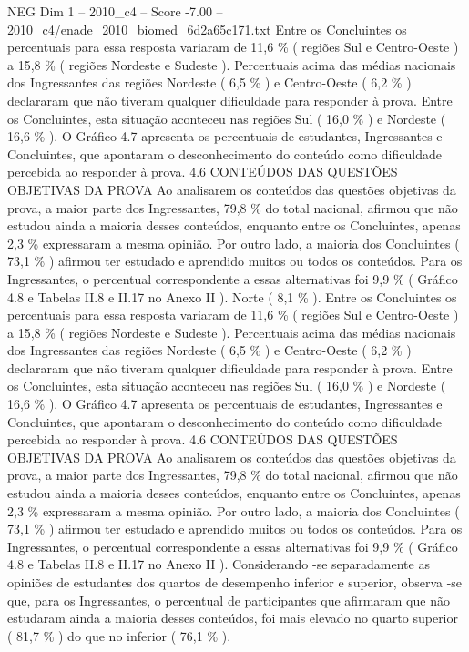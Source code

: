 \begin{textsample}{NEG Dim 1 – 2010\_c4 – Score -7.00 – 2010\_c4/enade\_2010\_biomed\_6d2a65c171.txt}
Entre os Concluintes os percentuais para essa resposta variaram de 11,6 \% ( regiões Sul e Centro-Oeste ) a 15,8 \% ( regiões Nordeste e Sudeste ).
Percentuais acima das médias nacionais dos Ingressantes das regiões Nordeste ( 6,5 \% ) e Centro-Oeste ( 6,2 \% ) declararam que não tiveram qualquer dificuldade para responder à prova.
Entre os Concluintes, esta situação aconteceu nas regiões Sul ( 16,0 \% ) e Nordeste ( 16,6 \% ).
O Gráfico 4.7 apresenta os percentuais de estudantes, Ingressantes e Concluintes, que apontaram o desconhecimento do conteúdo como dificuldade percebida ao responder à prova. 4.6 CONTEÚDOS DAS QUESTÕES OBJETIVAS DA PROVA Ao analisarem os conteúdos das questões objetivas da prova, a maior parte dos Ingressantes, 79,8 \% do total nacional, afirmou que não estudou ainda a maioria desses conteúdos, enquanto entre os Concluintes, apenas 2,3 \% expressaram a mesma opinião.
Por outro lado, a maioria dos Concluintes ( 73,1 \% ) afirmou ter estudado e aprendido muitos ou todos os conteúdos.
Para os Ingressantes, o percentual correspondente a essas alternativas foi 9,9 \% ( Gráfico 4.8 e Tabelas II.8 e II.17 no Anexo II ).
Norte ( 8,1 \% ).
Entre os Concluintes os percentuais para essa resposta variaram de 11,6 \% ( regiões Sul e Centro-Oeste ) a 15,8 \% ( regiões Nordeste e Sudeste ).
Percentuais acima das médias nacionais dos Ingressantes das regiões Nordeste ( 6,5 \% ) e Centro-Oeste ( 6,2 \% ) declararam que não tiveram qualquer dificuldade para responder à prova.
Entre os Concluintes, esta situação aconteceu nas regiões Sul ( 16,0 \% ) e Nordeste ( 16,6 \% ).
O Gráfico 4.7 apresenta os percentuais de estudantes, Ingressantes e Concluintes, que apontaram o desconhecimento do conteúdo como dificuldade percebida ao responder à prova. 4.6 CONTEÚDOS DAS QUESTÕES OBJETIVAS DA PROVA Ao analisarem os conteúdos das questões objetivas da prova, a maior parte dos Ingressantes, 79,8 \% do total nacional, afirmou que não estudou ainda a maioria desses conteúdos, enquanto entre os Concluintes, apenas 2,3 \% expressaram a mesma opinião.
Por outro lado, a maioria dos Concluintes ( 73,1 \% ) afirmou ter estudado e aprendido muitos ou todos os conteúdos.
Para os Ingressantes, o percentual correspondente a essas alternativas foi 9,9 \% ( Gráfico 4.8 e Tabelas II.8 e II.17 no Anexo II ).
Considerando -se separadamente as opiniões de estudantes dos quartos de desempenho inferior e superior, observa -se que, para os Ingressantes, o percentual de participantes que afirmaram que não estudaram ainda a maioria desses conteúdos, foi mais elevado no quarto superior ( 81,7 \% ) do que no inferior ( 76,1 \% ).

\end{textsample}

